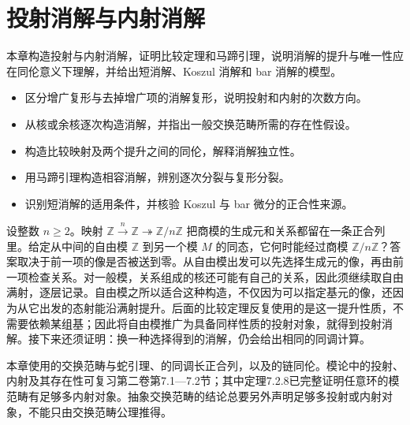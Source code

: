 
\chapter{投射消解与内射消解}
\label{b4:ch:07}

\begin{chapterabstract}
	本章构造投射与内射消解，证明比较定理和马蹄引理，说明消解的提升与唯一性应在同伦意义下理解，并给出短消解、Koszul 消解和 bar 消解的模型。
\end{chapterabstract}

\begin{learninggoals}
	\begin{itemize}
		\item 区分增广复形与去掉增广项的消解复形，说明投射和内射的次数方向。
		\item 从核或余核逐次构造消解，并指出一般交换范畴所需的存在性假设。
		\item 构造比较映射及两个提升之间的同伦，解释消解独立性。
		\item 用马蹄引理构造相容消解，辨别逐次分裂与复形分裂。
		\item 识别短消解的适用条件，并核验 Koszul 与 bar 微分的正合性来源。
	\end{itemize}
\end{learninggoals}

设整数 \(n\ge2\)。映射 \(\mathbb Z\xrightarrow{n}\mathbb Z\twoheadrightarrow\mathbb Z/n\mathbb Z\) 把商模的生成元和关系都留在一条正合列里。给定从中间的自由模 \(\mathbb Z\) 到另一个模 \(M\) 的同态，它何时能经过商模 \(\mathbb Z/n\mathbb Z\)？答案取决于前一项的像是否被送到零。从自由模出发可以先选择生成元的像，再由前一项检查关系。对一般模，关系组成的核还可能有自己的关系，因此须继续取自由满射，逐层记录。自由模之所以适合这种构造，不仅因为可以指定基元的像，还因为从它出发的态射能沿满射提升。后面的比较定理反复使用的是这一提升性质，不需要依赖某组基；因此将自由模推广为具备同样性质的投射对象，就得到投射消解。接下来还须证明：换一种选择得到的消解，仍会给出相同的同调计算。

\ProseParagraphBreak
本章使用的交换范畴与蛇引理、的同调长正合列，以及的链同伦。模论中的投射、内射及其存在性可复习第二卷第7.1—7.2节；其中定理7.2.8已完整证明任意环的模范畴有足够多内射对象。抽象交换范畴的结论总要另外声明足够多投射或内射对象，不能只由交换范畴公理推得。

